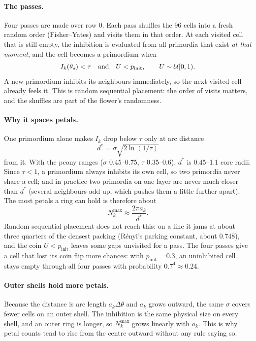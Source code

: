 \paragraph{The passes.} Four passes are made over row 0. Each pass shuffles
the 96 cells into a fresh random order (Fisher--Yates) and visits them in that
order. At each visited cell that is still empty, the inhibition is evaluated
from all primordia that exist \emph{at that moment}, and the cell becomes a
primordium when
\[
  I_k(\theta_s) < \tau \quad\text{and}\quad U < p_{\mathrm{init}},
  \qquad U \sim \mathcal{U}[0,1).
\]
A new primordium inhibits its neighbours immediately, so the next visited cell
already feels it. This is random sequential placement: the order of visits
matters, and the shuffles are part of the flower's randomness.

\paragraph{Why it spaces petals.} One primordium alone makes $I_k$ drop below
$\tau$ only at arc distance
\[
  d^* = \sigma\sqrt{2\ln(1/\tau)}
\]
from it. With the peony ranges ($\sigma$ 0.45--0.75, $\tau$ 0.35--0.6),
$d^*$ is 0.45--1.1 core radii. Since $\tau<1$, a primordium always inhibits
its own cell, so two primordia never share a cell; and in practice two
primordia on one layer are never much closer than $d^*$ (several neighbours
add up, which pushes them a little further apart). The most petals a ring can
hold is therefore about
\[
  N_k^{\max} \approx \frac{2\pi a_k}{d^*}.
\]
Random sequential placement does not reach this: on a line it jams at about
three quarters of the densest packing (Rényi's parking constant, about
0.748), and the coin $U < p_{\mathrm{init}}$ leaves some gaps unvisited for a
pass. The four passes give a cell that lost its coin flip more chances: with
$p_{\mathrm{init}} = 0.3$, an uninhibited cell stays empty through all four
passes with probability $0.7^4 \approx 0.24$.

\paragraph{Outer shells hold more petals.} Because the distance is arc length
$a_k\Delta\theta$ and $a_k$ grows outward, the same $\sigma$ covers fewer cells
on an outer shell. The inhibition is the same physical size on every shell,
and an outer ring is longer, so $N_k^{\max}$ grows linearly with $a_k$. This is
why petal counts tend to rise from the centre outward without any rule saying
so.

